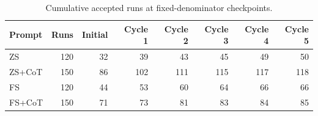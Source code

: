 \begin{table}
\caption{Cumulative accepted runs at fixed-denominator checkpoints.}
\label{tab:recovery}
\begin{tabular}{lrrrrrrr}
\toprule
Prompt & Runs & Initial & Cycle 1 & Cycle 2 & Cycle 3 & Cycle 4 & Cycle 5 \\
\midrule
ZS & 120 & 32 & 39 & 43 & 45 & 49 & 50 \\
ZS+CoT & 150 & 86 & 102 & 111 & 115 & 117 & 118 \\
FS & 120 & 44 & 53 & 60 & 64 & 66 & 66 \\
FS+CoT & 150 & 71 & 73 & 81 & 83 & 84 & 85 \\
\bottomrule
\end{tabular}
\end{table}
